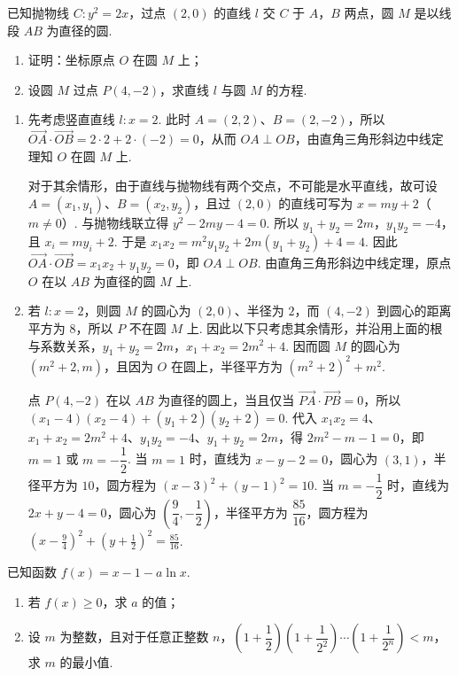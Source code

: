 \begin{problem}
已知抛物线 \(C:y^2=2x\)，过点 \((2,0)\) 的直线 \(l\) 交 \(C\) 于 \(A\)，\(B\) 两点，圆 \(M\) 是以线段 \(AB\) 为直径的圆.

\begin{enumerate}
\item 证明：坐标原点 \(O\) 在圆 \(M\) 上；
\item 设圆 \(M\) 过点 \(P(4,-2)\)，求直线 \(l\) 与圆 \(M\) 的方程.
\end{enumerate}
\end{problem}

\begin{solution}
\begin{enumerate}
\item 先考虑竖直直线 \(l:x=2\). 此时 \(A=(2,2)\)、\(B=(2,-2)\)，所以 \(\overrightarrow{OA}\cdot\overrightarrow{OB}=2\cdot2+2\cdot(-2)=0\)，从而 \(OA\perp OB\)，由直角三角形斜边中线定理知 \(O\) 在圆 \(M\) 上.

对于其余情形，由于直线与抛物线有两个交点，不可能是水平直线，故可设 \(A=(x_1,y_1)\)、\(B=(x_2,y_2)\)，且过 \((2,0)\) 的直线可写为 \(x=my+2\)（\(m\ne0\)）. 与抛物线联立得 \(y^2-2my-4=0\). 所以 \(y_1+y_2=2m\)，\(y_1y_2=-4\)，且 \(x_i=my_i+2\). 于是 \(x_1x_2=m^2y_1y_2+2m(y_1+y_2)+4=4\).
因此 \(\overrightarrow{OA}\cdot\overrightarrow{OB}=x_1x_2+y_1y_2=0\)，即 \(OA\perp OB\). 由直角三角形斜边中线定理，原点 \(O\) 在以 \(AB\) 为直径的圆 \(M\) 上.
\item 若 \(l:x=2\)，则圆 \(M\) 的圆心为 \((2,0)\)、半径为 \(2\)，而 \((4,-2)\) 到圆心的距离平方为 \(8\)，所以 \(P\) 不在圆 \(M\) 上. 因此以下只考虑其余情形，并沿用上面的根与系数关系，\(y_1+y_2=2m\)，\(x_1+x_2=2m^2+4\). 因而圆 \(M\) 的圆心为 \((m^2+2,m)\)，且因为 \(O\) 在圆上，半径平方为 \((m^2+2)^2+m^2\).

点 \(P(4,-2)\) 在以 \(AB\) 为直径的圆上，当且仅当 \(\overrightarrow{PA}\cdot\overrightarrow{PB}=0\)，所以 \((x_1-4)(x_2-4)+(y_1+2)(y_2+2)=0\).
代入 \(x_1x_2=4\)、\(x_1+x_2=2m^2+4\)、\(y_1y_2=-4\)、\(y_1+y_2=2m\)，得 \(2m^2-m-1=0\)，即 \(m=1\) 或 \(m=-\dfrac12\). 当 \(m=1\) 时，直线为 \(x-y-2=0\)，圆心为 \((3,1)\)，半径平方为 \(10\)，圆方程为 \((x-3)^2+(y-1)^2=10\). 当 \(m=-\dfrac12\) 时，直线为 \(2x+y-4=0\)，圆心为 \(\left(\dfrac94,-\dfrac12\right)\)，半径平方为 \(\dfrac{85}{16}\)，圆方程为 \(\left(x-\frac94\right)^2+\left(y+\frac12\right)^2=\frac{85}{16}\).
\end{enumerate}
\end{solution}

\begin{problem}
已知函数 \(f(x)=x-1-a\ln x\).

\begin{enumerate}
\item 若 \(f(x)\ge 0\)，求 \(a\) 的值；
\item 设 \(m\) 为整数，且对于任意正整数 \(n\)，\(\left(1+\dfrac12\right)\left(1+\dfrac1{2^2}\right)\cdots\left(1+\dfrac1{2^n}\right)<m\)，求 \(m\) 的最小值.
\end{enumerate}
\end{problem}

